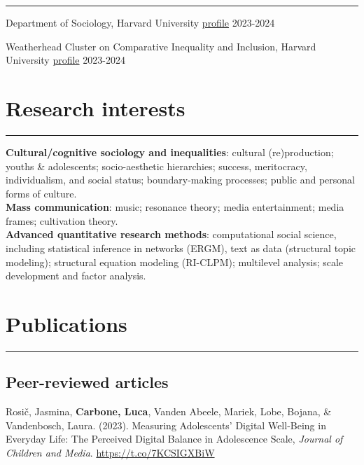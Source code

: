 \documentclass[12pt,]{article}
\begin{document}
\vspace{-10pt}
\rule{1\linewidth}{\linethickness}

Department of Sociology, Harvard University
\href{https://sociology.fas.harvard.edu/people/luca-carbone}{profile}
\hfill \begingroup\small 2023-2024\endgroup

Weatherhead Cluster on Comparative Inequality and Inclusion, Harvard
University
\href{https://inequality.wcfia.harvard.edu/people/luca-carbone-0}{profile}
\hfill \begingroup\small 2023-2024\endgroup

\hypertarget{research-interests}{%
\section{Research interests}\label{research-interests}}

\vspace{-10pt}
\rule{1\linewidth}{\linethickness}

\textbf{Cultural/cognitive sociology and inequalities}: cultural
(re)production; youths \& adolescents; socio-aesthetic hierarchies;
success, meritocracy, individualism, and social status; boundary-making
processes; public and personal forms of culture.\\

\textbf{Mass communication}: music; resonance theory; media
entertainment; media frames; cultivation theory.\\

\textbf{Advanced quantitative research methods}: computational social
science, including statistical inference in networks (ERGM), text as
data (structural topic modeling); structural equation modeling
(RI-CLPM); multilevel analysis; scale development and factor analysis.

\hypertarget{publications}{%
\section{Publications}\label{publications}}

\vspace{-10pt}
\rule{1\linewidth}{\linethickness}

\hypertarget{peer-reviewed-articles}{%
\subsection{Peer-reviewed articles}\label{peer-reviewed-articles}}

Rosič, Jasmina, \textbf{Carbone, Luca}, Vanden Abeele, Mariek, Lobe,
Bojana, \& Vandenbosch, Laura. (2023). Measuring Adolescents' Digital
Well-Being in Everyday Life: The Perceived Digital Balance in
Adolescence Scale, \emph{Journal of Children and Media}.
\url{https://t.co/7KCSIGXBiW} \newline
\end{document}
